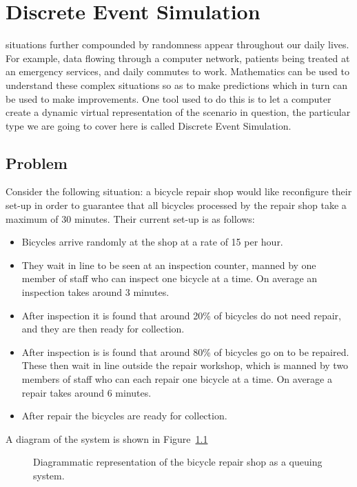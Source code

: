 \chapter[Discrete Event Simulation]{Discrete Event Simulation}

 situations further compounded by randomness appear
throughout our daily lives. For example, data flowing through a computer
network, patients being treated at an emergency services, and daily commutes to
work.
Mathematics can be used to understand these complex situations so as to
make predictions which in turn can be used to make improvements. One tool used
to do this is to let a computer create a dynamic virtual representation of the
scenario in question, the particular type we are going to cover here is called
Discrete Event Simulation.

\section{Problem}\label{sec:problem}

Consider the following situation: a bicycle repair shop would like reconfigure
their set-up in order to guarantee that all bicycles processed by the repair
shop take a maximum of 30 minutes.
Their current set-up is as follows:

\begin{itemize}
  \item Bicycles arrive randomly at the shop at a rate of 15 per hour.
  \item They wait in line to be seen at an inspection counter, manned by one
  member of staff who can inspect one bicycle at a time. On average an
  inspection takes around 3 minutes.
  \item After inspection it is found that around 20\% of bicycles do not need
  repair, and they are then ready for collection.
  \item After inspection is is found that around 80\% of bicycles go on to be
  repaired. These then wait in line outside the repair workshop, which is manned
  by two members of staff who can each repair one bicycle at a time. On average
  a repair takes around 6 minutes.
  \item After repair the bicycles are ready for collection.
\end{itemize}

A diagram of the system is shown in Figure~\ref{fig:bike-shop}

\begin{figure}
\begin{center}

\end{center}
\caption{Diagrammatic representation of the bicycle repair shop as a queuing system.}
\label{fig:bike-shop}
\end{figure}

